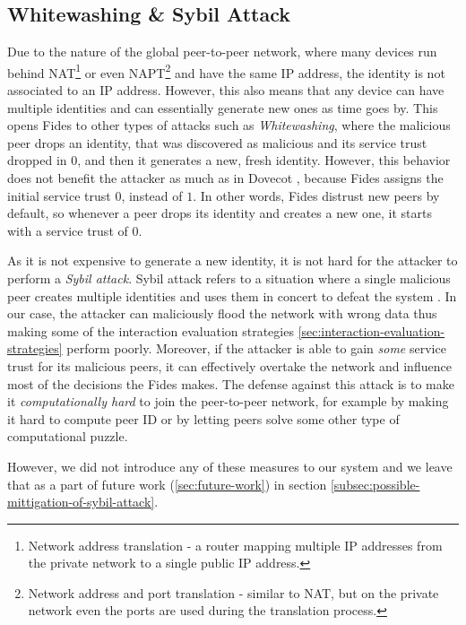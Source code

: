 \subsection{Whitewashing \& Sybil Attack}
\label{subsec:whitewashing-and-sybil-attack}
Due to the nature of the global peer-to-peer network, where many devices run behind NAT\footnote{Network address translation - a router mapping multiple IP addresses from the private network to a single public IP address.} or even NAPT\footnote{Network address and port translation - similar to NAT, but on the private network even the ports are used during the translation process.} and have the same IP address, the identity is not associated to an IP address.
However, this also means that any device can have multiple identities and can essentially generate new ones as time goes by.
This opens Fides to other types of attacks such as \textit{Whitewashing}, where the malicious peer drops an identity, that was discovered as malicious and its service trust dropped in $0$, and then it generates a new, fresh identity.
However, this behavior does not benefit the attacker as much as in Dovecot \cite{dita}, because Fides assigns the initial service trust $0$, instead of $1$.
In other words, Fides distrust new peers by default, so whenever a peer drops its identity and creates a new one, it starts with a service trust of $0$.

As it is not expensive to generate a new identity, it is not hard for the attacker to perform a \textit{Sybil attack}.
Sybil attack refers to a situation where a single malicious peer creates multiple identities and uses them in concert to defeat the system \cite{sybil}.
In our case, the attacker can maliciously flood the network with wrong data thus making some of the interaction evaluation strategies \ref{sec:interaction-evaluation-strategies} perform poorly.
Moreover, if the attacker is able to gain \textit{some} service trust for its malicious peers, it can effectively overtake the network and influence most of the decisions the Fides makes.
The defense against this attack is to make it \textit{computationally hard} to join the peer-to-peer network, for example by making it hard to compute peer ID or by letting peers solve some other type of computational puzzle. 

However, we did not introduce any of these measures to our system and we leave that as a part of future work (\ref{sec:future-work}) in section \ref{subsec:possible-mittigation-of-sybil-attack}. 